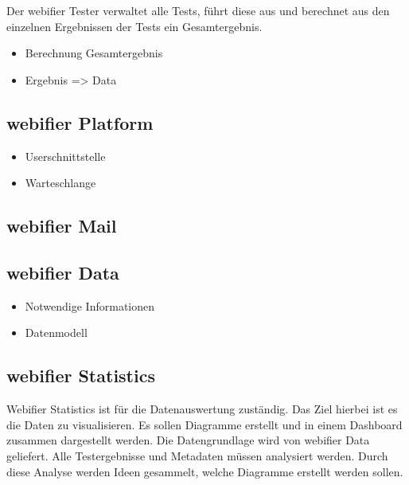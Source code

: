 Der webifier Tester verwaltet alle Tests, führt diese aus und berechnet aus den einzelnen Ergebnissen der Tests ein Gesamtergebnis.


\begin{itemize}
  \item Berechnung Gesamtergebnis
  \item Ergebnis => Data
\end{itemize}

\subsection{webifier Platform}


\begin{itemize}
  \item Userschnittstelle
  \item Warteschlange
\end{itemize}

\subsection{webifier Mail}


\subsection{webifier Data}


\begin{itemize}
  \item Notwendige Informationen
  \item Datenmodell
\end{itemize}

\subsection{webifier Statistics}

Webifier Statistics ist für die Datenauswertung zuständig. Das Ziel hierbei ist es die Daten zu visualisieren. Es sollen Diagramme erstellt und in einem Dashboard zusammen dargestellt werden. Die Datengrundlage wird von webifier Data geliefert. Alle Testergebnisse und Metadaten müssen analysiert werden. Durch diese Analyse werden Ideen gesammelt, welche Diagramme erstellt werden sollen.

